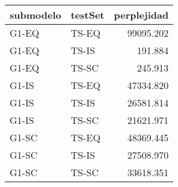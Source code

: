 \begin{tabular}{llr}
\toprule
submodelo & testSet &  perplejidad \\
\midrule
    G1-EQ &   TS-EQ &    99095.202 \\
    G1-EQ &   TS-IS &      191.884 \\
    G1-EQ &   TS-SC &      245.913 \\
    G1-IS &   TS-EQ &    47334.820 \\
    G1-IS &   TS-IS &    26581.814 \\
    G1-IS &   TS-SC &    21621.971 \\
    G1-SC &   TS-EQ &    48369.445 \\
    G1-SC &   TS-IS &    27508.970 \\
    G1-SC &   TS-SC &    33618.351 \\
\bottomrule
\end{tabular}
